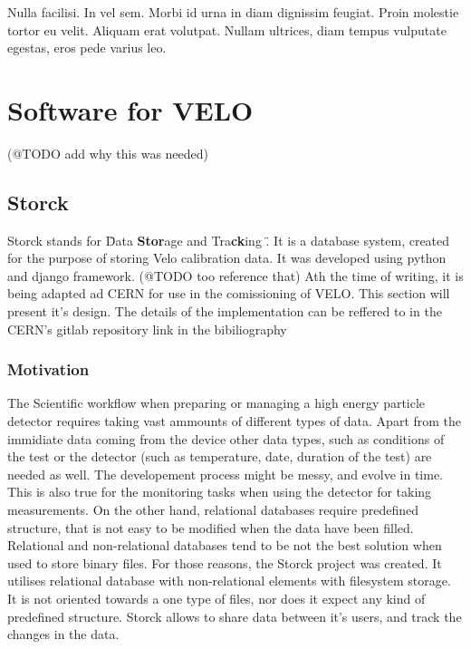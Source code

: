 \begin{savequote}[75mm]
Nulla facilisi. In vel sem. Morbi id urna in diam dignissim feugiat. Proin molestie tortor eu velit. Aliquam erat volutpat. Nullam ultrices, diam tempus vulputate egestas, eros pede varius leo.
\end{savequote}

\chapter{Software for VELO}
(@TODO add why this was needed)

\section{Storck}

Storck stands for \" Data \textbf{Stor}age and Tra\textbf{ck}ing \". It is a database system, created for the purpose of storing Velo calibration data.
It was developed using python and django framework.
(@TODO too reference that)
Ath the time of writing, it is being adapted ad CERN for use in the comissioning of VELO.
This section will present it's design.
The details of the implementation can be reffered to in the CERN's gitlab repository link in the bibiliography \cite{bworld}

\subsection{Motivation}

The Scientific workflow when preparing or managing a high energy particle detector requires taking vast ammounts of different types of data. Apart from the immidiate data coming from the device other data types, such as conditions of the test or the detector (such as temperature, date, duration of the test) are needed as well. 
The developement process might be messy, and evolve in time. This is also true for the monitoring tasks when using the detector for taking measurements. 
On the other hand, relational databases require predefined structure, that is not easy to be modified when the data have been filled. 
Relational and non-relational databases tend to be not the best solution when used to store binary files.
For those reasons, the Storck project was created.
It utilises relational database with non-relational elements with filesystem storage.
It is not oriented towards a one type of files, nor does it expect any kind of predefined structure.
Storck allows to share data between it's users, and track the changes in the data.


